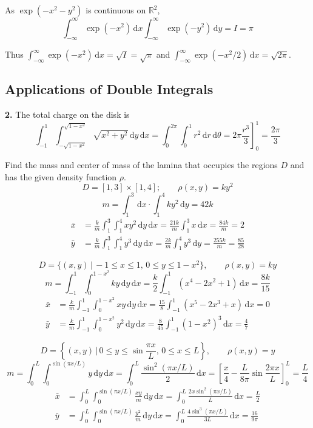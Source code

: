 \documentclass[a4paper,12pt]{article}
\newcommand{\ud}{\,\mathrm{d}}
\newcommand{\exercise}[1]{\noindent\textbf{#1.}}
\begin{document}
As $\exp(-x^2-y^2)$ is continuous on $\mathbb{R}^2$,
\[\int_{-\infty}^\infty\exp(-x^2)\ud x\int_{-\infty}^\infty\exp(-y^2)\ud y
= I = \pi\tag{b}\]

Thus $\int_{-\infty}^\infty\exp(-x^2)\ud x = \sqrt I = \sqrt\pi$ and
$\int_{-\infty}^\infty\exp(-x^2/2)\ud x = \sqrt{2\pi}$.

\subsection{Applications of Double Integrals}
\exercise{2} The total charge on the disk is
\[\int_{-1}^1\int_{-\sqrt{1-x^2}}^{\sqrt{1-x^2}}\sqrt{x^2 + y^2}\ud y\ud x
= \int_0^{2\pi}\int_0^1 r^2\ud r\ud\theta
= \left.2\pi\frac{r^3}{3}\right]_0^1
= \frac{2\pi}{3}\]

\noindent Find the mass and center of mass of the lamina that occupies the
regions $D$ and has the given density function $\rho$.
\[D = [1, 3]\times[1, 4];\qquad\rho(x, y) = ky^2\tag{3}\]
\[m = \int_1^3\ud x \cdot \int_1^4 ky^2\ud y = 42k\]
\begin{align*}
  \bar x &= \frac{k}{m}\int_1^3\int_1^4 xy^2\ud y\ud x
= \frac{21k}{m}\int_1^3 x\ud x
= \frac{84k}{m}
= 2\\
  \bar y &= \frac{k}{m}\int_1^3\int_1^4 y^3\ud y\ud x
= \frac{2k}{m}\int_1^4 y^3\ud y
= \frac{255k}{m}
= \frac{85}{28}
\end{align*}

\[D = \{(x, y)\,|\,-1 \leq x \leq 1,\,0 \leq y \leq 1 - x^2\},\qquad
\rho(x, y) = ky\tag{7}\]
\[m = \int_{-1}^1\int_0^{1-x^2} ky\ud y\ud x
= \frac{k}{2}\int_{-1}^1 (x^4 - 2x^2 + 1)\ud x
= \frac{8k}{15}\]
\begin{align*}
  \bar x &= \frac{k}{m}\int_{-1}^1\int_0^{1-x^2} xy\ud y\ud x
  = \frac{15}{8}\int_{-1}^1 (x^5 - 2x^3 + x)\ud x
  = 0\\
  \bar y &= \frac{k}{m}\int_{-1}^1\int_0^{1-x^2} y^2\ud y\ud x
  = \frac{8}{45}\int_{-1}^1 (1 - x^2)^3\ud x
  = \frac{4}{7}
\end{align*}
\pagebreak

\[D = \left\{(x, y)\,\Big|\,0\leq y\leq\sin\frac{\pi x}{L},\,
0\leq x\leq L\right\},\qquad\rho(x, y) = y\tag{9}\]
\[m = \int_0^L\int_0^{\sin(\pi x/L)}y\ud y\ud x
= \int_0^L\frac{\sin^2(\pi x/L)}{2}\ud x
= \left[\frac{x}{4} - \frac{L}{8\pi}\sin\frac{2\pi x}{L}\right]_0^L
= \frac{L}{4}\]
\begin{align*}
  \bar x &= \int_0^L\int_0^{\sin(\pi x/L)}\frac{xy}{m}\ud y\ud x
= \int_0^L\frac{2x\sin^2(\pi x/L)}{L}\ud x
= \frac{L}{2}\\
  \bar y &= \int_0^L\int_0^{\sin(\pi x/L)}\frac{y^2}{m}\ud y\ud x
= \int_0^L\frac{4\sin^3(\pi x/L)}{3L}\ud x
= \frac{16}{9\pi}
\end{align*}
\end{document}
